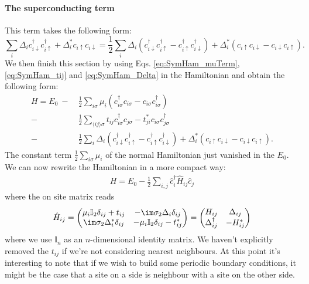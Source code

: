 \documentclass[../main.tex]{subfile}
\begin{document}
\paragraph{The superconducting term}$~$\\ 
This term takes the following form:
\begin{equation}\label{eq:SymHam_Delta}
\sum_{i} \Delta_i c_{i\downarrow}^{\dagger}c_{i\uparrow}^{\dagger} + \Delta_i^{\ast} c_{i\uparrow}c_{i\downarrow}
        = \frac{1}{2}\sum_{i} \Delta_i \left(c_{i\downarrow}^{\dagger}c_{i\uparrow}^{\dagger}-c_{i\uparrow}^{\dagger}c_{i\downarrow}^{\dagger}\right)+ \Delta_i^{\ast} \left(c_{i\uparrow}c_{i\downarrow}-c_{i\downarrow}c_{i\uparrow}\right).
\end{equation}
We then finish this section by using Eqs. \ref{eq:SymHam_muTerm}, \ref{eq:SymHam_tij} and \ref{eq:SymHam_Delta} in the Hamiltonian and obtain the following form:
\begin{equation}\label{eq:Ham_Symm_Supercond_1}
    \begin{aligned}
    H = E_0 ~-~& \frac{1}{2} \sum_{i\sigma} \mu_i\left(c_{i\sigma}^{\dagger}c_{i\sigma} - c_{i\sigma}c_{i\sigma}^{\dagger}\right)\\
    -& \frac{1}{2}\sum_{\langle ij\rangle \sigma} t_{ij}c_{i\sigma}^{\dagger}c_{j\sigma} - t_{ji}^{\ast}c_{i\sigma}c_{j\sigma}^{\dagger}\\
    -& \frac{1}{2}\sum_{i} \Delta_i \left(c_{i\downarrow}^{\dagger}c_{i\uparrow}^{\dagger}-c_{i\uparrow}^{\dagger}c_{i\downarrow}^{\dagger}\right) +
    \Delta_i^{\ast} \left(c_{i\uparrow}c_{i\downarrow}-c_{i\downarrow}c_{i\uparrow}\right).
    \end{aligned}
\end{equation}
The constant term $\frac{1}{2} \sum_{i\sigma} \mu_i$ of the normal Hamiltonian just vanished in the $E_0$.
We can now rewrite the Hamiltonian in a more compact way:
\begin{align}
    H = E_0 - \frac{1}{2}\sum_{i,j} \hat{c}_i^{\dagger} \hat{H}_{ij} \hat{c}_j  \label{eq:BdG_sys_H}
\end{align}
where the on site matrix reads
\begin{align}
    \hat{H}_{ij} = \begin{pmatrix}
        \mu_i \mathbb{I}_2 \delta_{ij} + t_{ij} & -\im\sigma_2\Delta_i \delta_{ij}\\
        \im\sigma_2\Delta^{\ast}_i \delta_{ij} & -\mu_i \mathbb{I}_2 \delta_{ij} - t_{ij}^{\ast}
    \end{pmatrix} = \begin{pmatrix}
        H_{ij} & \Delta_{ij}\\
        \Delta_{ij}^{\dagger} & -H_{ij}^{\ast}
    \end{pmatrix}    \label{eq:H^_ij} 
\end{align}
where we use $\mathbb{I}_n$ as an $n$-dimensional identity matrix. We haven't explicitly removed the 
$t_{ij}$ if we're not considering nearest neighbours.
At this point it's interesting to note that if we wish to build some periodic boundary conditions, 
it might be the case that a site on a side is neighbour with a site on the other side.\\  
\end{document}
